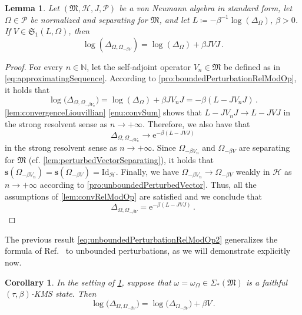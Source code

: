 \documentclass[a4paper, twoside, 11pt, reqno]{amsart}
\theoremstyle{definition}
\theoremstyle{plain}
\newtheorem{lemma}[definition]{Lemma}
\newtheorem{corollary}[definition]{Corollary}
\renewcommand{\Delta}{\varDelta}
\renewcommand{\Sigma}{\varSigma}
\renewcommand{\Omega}{\varOmega}
\newcommand{\N}{\mathbb{N}}
\newcommand{\MH}{\mathcal{H}}
\newcommand{\MFM}{\mathfrak{M}}
\newcommand{\MFS}{\mathfrak{S}}
\newcommand{\ee}{\mathrm{e}}
\newcommand{\NS}[1]{\Sigma_{\ast}(#1)}
\newcommand{\NPC}{\mathcal{P}}
\newcommand{\id}{\mathrm{Id}}
\newcommand{\1}{\mathbf{1}}
\newcommand{\ssupp}{\mathbf{s}}
\newcommand{\ce}{\coloneqq}
\newcommand{\inv}[1]{#1^{-1}}
\begin{document}
\begin{lemma}\label{lem:unboundedPerturbationRelModOp2}
    Let $(\MFM, \MH, J, \NPC)$ be a von Neumann algebra in standard form, let $\Omega \in \NPC$ be normalized and separating for $\MFM$, and let $L \ce - \inv{\beta} \log(\Delta_\Omega)$, $\beta > 0$. If $V \in \MFS_1(L, \Omega)$, then
    \begin{equation}\label{eq:unboundedPerturbationRelModOp2}
        \log(\Delta_{\Omega, \Omega_{- \beta V}}) = \log (\Delta_\Omega) + \beta J V J \, .
    \end{equation}
\end{lemma}

\begin{proof}
    For every $n \in \N$, let the self-adjoint operator $V_n \in \MFM$ be defined as in \cref{eq:approximatingSequence}. According to \cref{pro:boundedPerturbationRelModOp}, it holds that
    \begin{equation*}
        \log \bigl(\Delta_{\Omega, \Omega_{- \beta V_n}}\bigr) = \log(\Delta_\Omega) + \beta J V_n J = - \beta (L - J V_n J) \, .
    \end{equation*}
    \cref{lem:convergenceLiouvillian} \ref{enu:convSum} shows that $L - J V_n J \to L - J V J$ in the strong resolvent sense as $n \to + \infty$. Therefore, we also have that
    \begin{equation*}
        \Delta_{\Omega, \Omega_{- \beta V_n}} \to \ee^{- \beta (L - J V J)}
    \end{equation*}
    in the strong resolvent sense as $n \to + \infty$. Since $\Omega_{- \beta V_n}$ and $\Omega_{- \beta V}$ are separating for $\MFM$ (cf. \cref{lem:perturbedVectorSeparating}), it holds that $\ssupp(\Omega_{- \beta V_n}) = \ssupp(\Omega_{- \beta V}) = \id_\MH$. Finally, we have $\Omega_{- \beta V_n} \to \Omega_{- \beta V}$ weakly in $\MH$ as $n \to + \infty$ according to \cref{pro:unboundedPerturbedVector}. Thus, all the assumptions of \cref{lem:convRelModOp} are satisfied and we conclude that
    \begin{equation*}
        \Delta_{\Omega, \Omega_{- \beta V}} = \ee^{- \beta (L - J V J)} \, . \tag*{\qedhere}
    \end{equation*}
\end{proof}

The previous result \eqref{eq:unboundedPerturbationRelModOp2} generalizes the formula of Ref.~\cite[Thm. 5.1 (8)]{DJP03} to unbounded perturbations, as we will demonstrate explicitly now.

\begin{corollary}\label{cor:unboundedPerturbationRelModOp3}
    In the setting of \cref{lem:unboundedPerturbationRelModOp2}, suppose that $\omega = \omega_\Omega \in \NS{\MFM}$ is a faithful $(\tau, \beta)$-KMS state. Then
    \begin{equation}\label{eq:unboundedPerturbationRelModOp3}
        \log \bigl(\Delta_{\Omega, \Omega_{- \beta V}}\bigr) = \log \bigl(\Delta_{\Omega_{- \beta V}}\bigr) + \beta V \, .
    \end{equation}
\end{corollary}
\end{document}
